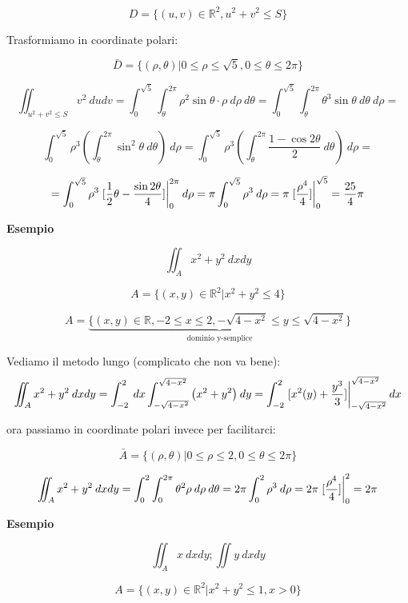 \documentclass[../appunti-analisi.tex]{subfiles}
\begin{document}
\[
    D= \{(u,v) \in \mathbb{R}^{2}, u^{2}+v^{2} \le S\}
\]

Trasformiamo in coordinate polari:

\[
    \bar{D} = \{(\rho,\theta) | 0 \le \rho \le \sqrt{5}, 0 \le \theta \le 2\pi\}
\]

\[
    \iint_{u^{2}+v^{2} \le S} {v ^{2}} \: dudv = \int_{0}^{\sqrt{5}} {\int_{\theta}^{2\pi} {\rho^{2} \sin \theta \cdot \rho} \: d \rho } \: d \theta = \int_{0}^{\sqrt{5}} {\int_{\theta}^{2\pi} {\theta^{3} \sin \theta} \: d \theta } \: d \rho =  
\]

\[
    \int_{0}^{\sqrt{5}} {\rho^{3} \left(\int_{\theta}^{2\pi} {\sin ^{2} \theta} \: d \theta \right)} \: d \rho = \int_{0}^{\sqrt{5}} {\rho^{3} \left( \int_{\theta}^{2\pi} { \frac{1- \cos 2 \theta}{2}} \: d \theta \right)} \: d \rho =   
\]

\[
    = \int_{0}^{\sqrt{5}} {\rho^{3} \left.[ \frac{1}{2} \theta - \frac{\sin 2 \theta}{4}]\right\rvert_{0}^{2\pi} } \: d \rho = \pi \int_{0}^{\sqrt{5}} {\rho^{3}} \: d \rho  = \pi \left.[ \frac{\rho^{4}}{4}]\right\rvert_{0}^{\sqrt{5}}  = \frac{25}{4}\pi 
\]

\textbf{Esempio} 

\[
\iint_A {x^{2}+y^{2}} \: d x d y  
\]

\[
    A = \{(x,y) \in \mathbb{R}^{2} | x^{2} + y^{2} \le 4\}
\]

\[
    A = \underbrace{\{(x,y) \in \mathbb{R}, -2 \le x \le 2, - \sqrt{4-x^{2}} \le  y \le  \sqrt{4 -x^{2}}\}}_\text{dominio y-semplice}\]

Vediamo il metodo lungo (complicato che non va bene):
\[
    \iint_A {x^{2}+y^{2}} \: d x d y = \int_{-2}^{2} {} \: dx  \int_{-\sqrt{4-x^{2}}}^{\sqrt{4-x^{2}}} {\left(x^{2} + y^{2}\right)} \: d y  = \int_{-2}^{2} { \left.[x^{2}(y)+ \frac{y^{3}}{3}]\right\rvert_{-\sqrt{4-x^{2}}}^{\sqrt{4-x^{2}}} } \: dx 
\]

ora passiamo in coordinate polari invece per facilitarci:

\[
    \bar{A}  = \{(\rho,\theta) | 0 \le \rho \le 2, 0 \le \theta \le 2\pi\}
\]

\[
    \iint_A {x^{2}+y^{2}} \: d x d y = \int_{0}^{2} {\int_{0}^{2\pi} {\theta^{2} \rho} \: d \rho } \: d \theta = 2\pi \int_{0}^{2} {\rho^{3}} \: d \rho = 2\pi \left.[ \frac{\rho^{4}}{4}]\right\rvert_{0}^{2} = 2\pi 
\]

\textbf{Esempio} 

\[
\iint_A {x} \: dx d y; \iint {y} \: d x d y  
\]

\[
    A = \{(x,y) \in \mathbb{R}^{2} | x^{2}+y^{2} \le 1, x>0\}
\]
\end{document}
